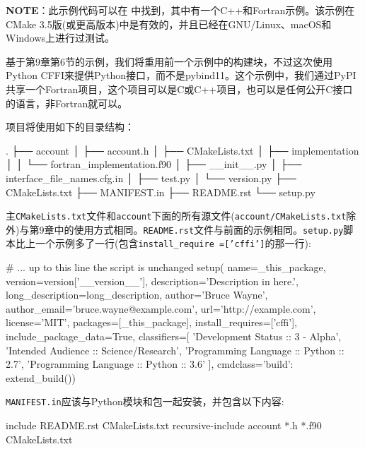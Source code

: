 \begin{myInfoBox}
\textbf{NOTE}：此示例代码可以在  中找到，其中有一个C++和Fortran示例。该示例在CMake 3.5版(或更高版本)中是有效的，并且已经在GNU/Linux、macOS和Windows上进行过测试。
\end{myInfoBox}

基于第9章第6节的示例，我们将重用前一个示例中的构建块，不过这次使用Python CFFI来提供Python接口，而不是pybind11。这个示例中，我们通过PyPI共享一个Fortran项目，这个项目可以是C或C++项目，也可以是任何公开C接口的语言，非Fortran就可以。


项目将使用如下的目录结构：

\begin{codebox}[shell]
.
├── account
│    ├── account.h
│    ├── CMakeLists.txt
│    ├── implementation
│    │    └── fortran_implementation.f90
│    ├── __init__.py
│    ├── interface_file_names.cfg.in
│    ├── test.py
│    └── version.py
├── CMakeLists.txt
├── MANIFEST.in
├── README.rst
└── setup.py
\end{codebox}

主\texttt{CMakeLists.txt}文件和\texttt{account}下面的所有源文件(\texttt{account/CMakeLists.txt}除外)与第9章中的使用方式相同。\texttt{README.rst}文件与前面的示例相同。\texttt{setup.py}脚本比上一个示例多了一行(包含\texttt{install\_require =['cffi']}的那一行):

\begin{codebox}[python]
# ... up to this line the script is unchanged
setup(
  name=_this_package,
  version=version['__version__'],
  description='Description in here.',
  long_description=long_description,
  author='Bruce Wayne',
  author_email='bruce.wayne@example.com',
  url='http://example.com',
  license='MIT',
  packages=[_this_package],
  install_requires=['cffi'],
  include_package_data=True,
  classifiers=[
    'Development Status :: 3 - Alpha',
    'Intended Audience :: Science/Research',
    'Programming Language :: Python :: 2.7',
    'Programming Language :: Python :: 3.6'
  ],
  cmdclass={'build': extend_build()})
\end{codebox}

\texttt{MANIFEST.in}应该与Python模块和包一起安装，并包含以下内容:

\begin{codebox}[text]
include README.rst CMakeLists.txt
recursive-include account *.h *.f90 CMakeLists.txt
\end{codebox}

